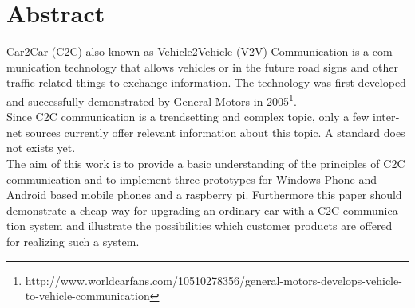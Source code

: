 \chapter{Abstract}
\begin{english} 
Car2Car (C2C) also known as Vehicle2Vehicle (V2V) Communication is a communication technology that allows vehicles or in the future road signs and other traffic related things to exchange information. The technology was first developed and successfully demonstrated by General Motors in 2005\footnote{http://www.worldcarfans.com/10510278356/general-motors-develops-vehicle-to-vehicle-communication}.
\\
Since C2C communication is a trendsetting and complex topic, only a few internet sources currently offer relevant information about this topic. A standard does not exists yet.\\
The aim of this work is to provide a basic understanding of the principles of C2C communication and to implement three prototypes for Windows Phone and Android based mobile phones and a raspberry pi. Furthermore this paper should demonstrate a cheap way for upgrading an ordinary car with a C2C communication system and illustrate the possibilities which customer products are offered for realizing such a system.

\end{english}